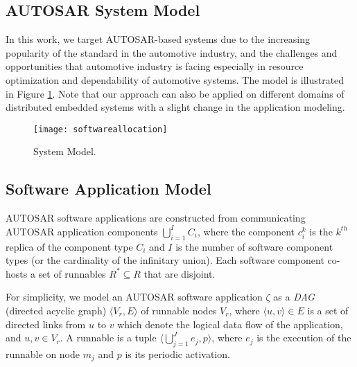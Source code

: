 
\subsection{AUTOSAR System Model}
In this work, we target AUTOSAR-based systems due to the increasing popularity of the standard in  the automotive industry, and the challenges and opportunities that automotive industry is facing especially in resource optimization and dependability of automotive systems. The model is illustrated in Figure \ref{fig_softwareallocation}. Note that our approach can also be applied on different domains of distributed embedded systems with a slight change in the application modeling.
\begin{figure}[!h]
\centering
\texttt{[image: softwareallocation]}
\caption{System Model.}
\label{fig_softwareallocation}
\end{figure}

\subsection{Software Application Model}
AUTOSAR software applications are constructed from communicating AUTOSAR application components $\bigcup_{i=1}^{I} C_i$, where the component $c_i^k$ is the $k^{th}$ replica of the component type $C_i$ and $I$ is the number of software component types (or the cardinality of the infinitary union). Each software component co-hosts a set of runnables $R^*\subseteq R$ that are disjoint.

\begin{definition} For simplicity, we model an AUTOSAR software application $\zeta$ as a \textit{DAG} (directed acyclic graph) $\langle V_r, E\rangle$ of runnable nodes $V_r$, where $\langle u,v\rangle\in E$ is a set of directed links from $u$ to $v$ which denote the logical data flow of the application, and $u,v\in V_r$. A runnable is a tuple $\langle \bigcup_{j=1}^{J} e_{j} , p \rangle$, where $e_{j}$ is the execution of the runnable on node $m_j$ and $p$ is its periodic activation.
\end{definition}

